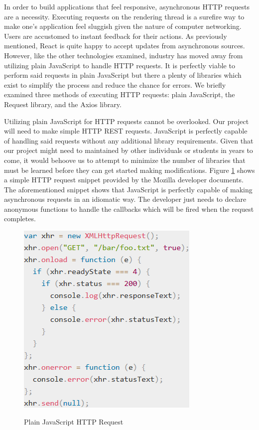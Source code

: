 \documentclass[12pt]{report}
\begin{document}
In order to build applications that feel responsive, asynchronous HTTP requests are a necessity. Executing requests on the rendering thread is a surefire way to make one's application feel sluggish given the nature of computer networking. Users are accustomed to instant feedback for their actions. As previously mentioned, React is quite happy to accept updates from asynchronous sources. However, like the other technologies examined, industry has moved away from utilizing plain JavaScript to handle HTTP requests. It is perfectly viable to perform said requests in plain JavaScript but there a plenty of libraries which exist to simplify the process and reduce the chance for errors. We briefly examined three methods of executing HTTP requests: plain JavaScript, the Request library, and the Axios library.

Utilizing plain JavaScript for HTTP requests cannot be overlooked. Our project will need to make simple HTTP REST requests. JavaScript is perfectly capable of handling said requests without any additional library requirements. Given that our project might need to maintained by other individuals or students in years to come, it would behoove us to attempt to minimize the number of libraries that must be learned before they can get started making modifications. Figure \ref{fig:javascripthttprequest} shows a simple HTTP request snippet provided by the Mozilla developer documents.\cite{mozillahttprequest} The aforementioned snippet shows that JavaScript is perfectly capable of making asynchronous requests in an idiomatic way. The developer just needs to declare anonymous functions to handle the callbacks which will be fired when the request completes.

\begin{figure}[h]
	\centering
	\caption{Plain JavaScript HTTP Request}
	\includegraphics[scale=0.5]{javascript_http_request}
	\label{fig:javascripthttprequest}
\end{figure}
\end{document}
